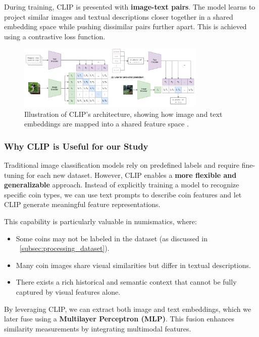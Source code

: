 \documentclass[nolibertine, english, algorithm, nomencl, minted]{ttlab-qualify}
\begin{document}
During training, CLIP is presented with \textbf{image-text pairs}. The model learns to project similar images and textual 
descriptions closer together in a shared embedding space while pushing dissimilar pairs further apart. 
This is achieved using a contrastive loss function.

\begin{figure}[h]
    \centering
    \includegraphics[width=0.8\textwidth]{static/clip_arch.png}
    \caption{Illustration of CLIP’s architecture, showing how image and text embeddings are mapped into a shared feature space \parencite{radford2021learning}.}
    \label{fig:clip_architecture}
\end{figure}

\subsubsection{Why CLIP is Useful for our Study}

Traditional image classification models rely on predefined labels and require fine-tuning for each new dataset. 
However, CLIP enables a \textbf{more flexible and generalizable} approach. Instead of explicitly training a model to 
recognize specific coin types, we can use text prompts to describe coin features and let CLIP generate meaningful feature representations.

This capability is particularly valuable in numismatics, where:
\begin{itemize}
    \item Some coins may not be labeled in the dataset (as discussed in ~\ref{subsec:processing_dataset}).
    \item Many coin images share visual similarities but differ in textual descriptions.
    \item There exists a rich historical and semantic context that cannot be fully captured by visual features alone.
\end{itemize}

By leveraging CLIP, we can extract both image and text embeddings, which we later fuse using a \textbf{Multilayer Perceptron (MLP)}. 
This fusion enhances similarity measurements by integrating multimodal features.
\end{document}
